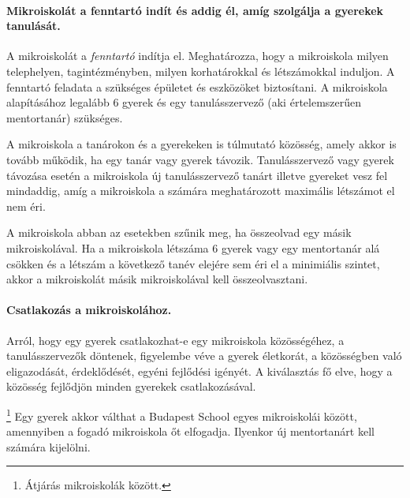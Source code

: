 \paragraph{Mikroiskolát a fenntartó indít és addig él, amíg szolgálja a
      gyerekek tanulását.}
A mikroiskolát a \emph{fenntartó} indítja el. Meghatározza, hogy a mikroiskola milyen telephelyen,
tagintézményben, milyen korhatárokkal és létszámokkal
induljon. A fenntartó feladata a szükséges épületet és eszközöket
biztosítani. A
mikroiskola alapításához legalább 6 gyerek és egy tanulásszervező (aki
értelemszerűen mentortanár)
szükséges.

A mikroiskola a tanárokon és a gyerekeken is túlmutató közösség, amely akkor is
tovább működik, ha egy tanár vagy gyerek távozik. Tanulásszervező vagy
gyerek távozása esetén a mikroiskola  új tanulásszervező tanárt illetve gyereket
vesz fel mindaddig, amíg a mikroiskola a számára meghatározott maximális
létszámot el nem éri.

A mikroiskola abban az esetekben szűnik meg, ha összeolvad egy másik
mikroiskolával. Ha a mikroiskola létszáma 6 gyerek vagy egy mentortanár alá csökken és
a létszám a következő tanév elejére sem éri el a minimiális szintet, akkor a mikroiskolát másik
mikroiskolával kell összeolvasztani.

\paragraph{Csatlakozás a mikroiskolához.}
Arról, hogy egy gyerek csatlakozhat-e egy mikroiskola közösségéhez, a
tanulásszervezők
döntenek, figyelembe véve a gyerek életkorát, a közösségben való
eligazodását, érdeklődését, egyéni fejlődési igényét. A kiválasztás fő elve, 
hogy a közösség fejlődjön minden gyerekek csatlakozásával.

\footnote{Átjárás mikroiskolák között.}
Egy gyerek akkor válthat a Budapest School egyes mikroiskolái között,
amennyiben a fogadó mikroiskola őt elfogadja. Ilyenkor új mentortanárt kell
számára kijelölni.
